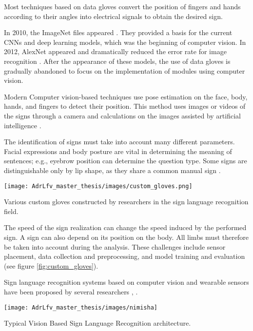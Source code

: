 Most techniques based on data gloves convert the position of fingers and hands according to their angles into electrical signals to obtain the desired sign. 

In 2010, the ImageNet files appeared \cite{li2010crowdsourcing}. They provided a basis for the current CNNs and deep learning models, which was the beginning of computer vision. In 2012, AlexNet appeared and dramatically reduced the error rate for image recognition \cite{alom2018history}. After the appearance of these models, the use of data gloves is gradually abandoned to focus on the implementation of modules using computer vision.

Modern Computer vision-based techniques use pose estimation on the face, body, hands, and fingers to detect their position. This method uses images or videos of the signs through a camera and calculations on the images assisted by artificial intelligence \cite{adeyanju2021machine}. 

The identification of signs must take into account many different parameters. Facial expressions and body posture are vital in determining the meaning of sentences; e.g., eyebrow position can determine the question type. Some signs are distinguishable only by lip shape, as they share a common manual sign \cite{cooper2011sign}. 


\begin{marginfigure}
    \centering
    \texttt{[image: AdrLfv\_master\_thesis/images/custom\_gloves.png]}
    \caption{Various custom gloves constructed by researchers in the sign language recognition field.}
    \label{fig:custom_gloves}
\end{marginfigure}

The speed of the sign realization can change the speed induced by the performed sign. A sign can also depend on its position on the body. All limbs must therefore be taken into account during the analysis. These challenges include sensor placement, data collection and preprocessing, and model training and evaluation \cite{9178440} (see figure \ref{fig:custom_gloves}).

Sign language recognition systems based on computer vision and wearable sensors have been proposed by several researchers \cite{ionescu2005dynamic} \cite{yu2010vision} \cite{li2015feature} \cite{sonkusare2015review} \cite{bobic2016hand} \cite{islam2017real} \cite{islam2017real} \cite{saha2018machine}, \cite{rastgoo2021hand} \cite{xu2021application} \cite{DextrEMS}. 

\begin{marginfigure}
    \centering
    \texttt{[image: AdrLfv\_master\_thesis/images/nimisha]}
    \caption{Typical Vision Based Sign Language Recognition architecture.}
    \label{fig:nimisha}
\end{marginfigure}

